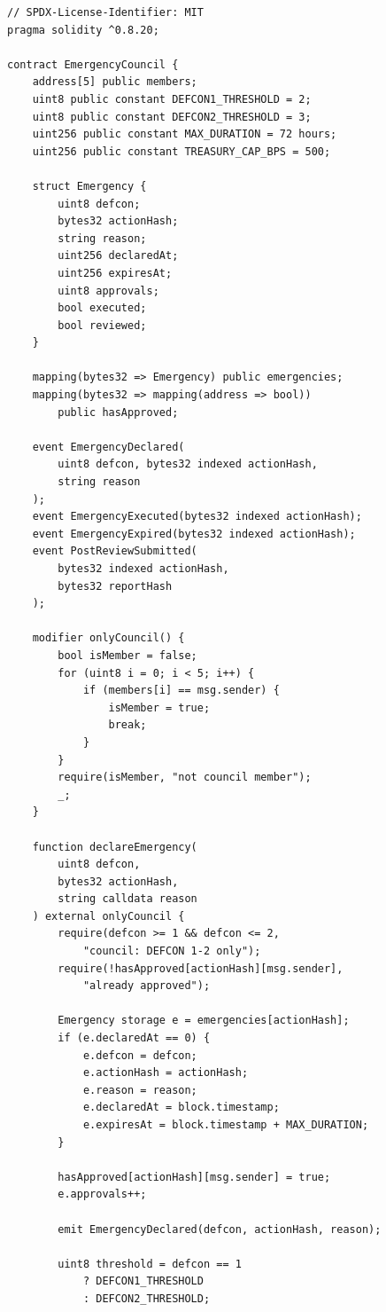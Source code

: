 \documentclass[11pt,letterpaper]{article}
\begin{document}
\begin{lstlisting}[language=Solidity,caption=EmergencyCouncil contract]
// SPDX-License-Identifier: MIT
pragma solidity ^0.8.20;

contract EmergencyCouncil {
    address[5] public members;
    uint8 public constant DEFCON1_THRESHOLD = 2;
    uint8 public constant DEFCON2_THRESHOLD = 3;
    uint256 public constant MAX_DURATION = 72 hours;
    uint256 public constant TREASURY_CAP_BPS = 500;

    struct Emergency {
        uint8 defcon;
        bytes32 actionHash;
        string reason;
        uint256 declaredAt;
        uint256 expiresAt;
        uint8 approvals;
        bool executed;
        bool reviewed;
    }

    mapping(bytes32 => Emergency) public emergencies;
    mapping(bytes32 => mapping(address => bool))
        public hasApproved;

    event EmergencyDeclared(
        uint8 defcon, bytes32 indexed actionHash,
        string reason
    );
    event EmergencyExecuted(bytes32 indexed actionHash);
    event EmergencyExpired(bytes32 indexed actionHash);
    event PostReviewSubmitted(
        bytes32 indexed actionHash,
        bytes32 reportHash
    );

    modifier onlyCouncil() {
        bool isMember = false;
        for (uint8 i = 0; i < 5; i++) {
            if (members[i] == msg.sender) {
                isMember = true;
                break;
            }
        }
        require(isMember, "not council member");
        _;
    }

    function declareEmergency(
        uint8 defcon,
        bytes32 actionHash,
        string calldata reason
    ) external onlyCouncil {
        require(defcon >= 1 && defcon <= 2,
            "council: DEFCON 1-2 only");
        require(!hasApproved[actionHash][msg.sender],
            "already approved");

        Emergency storage e = emergencies[actionHash];
        if (e.declaredAt == 0) {
            e.defcon = defcon;
            e.actionHash = actionHash;
            e.reason = reason;
            e.declaredAt = block.timestamp;
            e.expiresAt = block.timestamp + MAX_DURATION;
        }

        hasApproved[actionHash][msg.sender] = true;
        e.approvals++;

        emit EmergencyDeclared(defcon, actionHash, reason);

        uint8 threshold = defcon == 1
            ? DEFCON1_THRESHOLD
            : DEFCON2_THRESHOLD;


\end{lstlisting}
\end{document}
